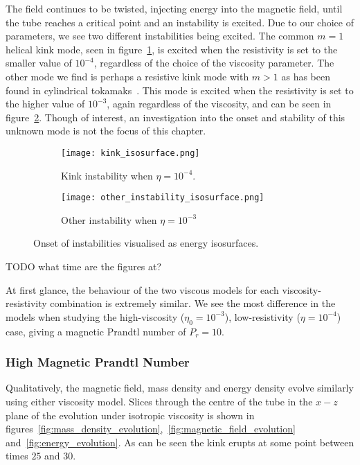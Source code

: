The field continues to be twisted, injecting energy into the magnetic field, until the tube reaches a critical point and an instability is excited. Due to our choice of parameters, we see two different instabilities being excited. The common $m=1$ helical kink mode, seen in figure~\ref{fig:kink_isosurface}, is excited when the resistivity is set to the smaller value of $10^{-4}$, regardless of the choice of the viscosity parameter. The other mode we find is perhaps a resistive kink mode with $m>1$ as has been found in cylindrical tokamaks~\cite{furthTearingModeCylindrical1973a}. This mode is excited when the resistivity is set to the higher value of $10^{-3}$, again regardless of the viscosity, and can be seen in figure~\ref{fig:other_instability_isosurface}. Though of interest, an investigation into the onset and stability of this unknown mode is not the focus of this chapter.

\begin{figure}[t]
  \centering
  \begin{subfigure}{.45\textwidth}
  \centering
  \texttt{[image: kink\_isosurface.png]}
  \caption{Kink instability when $\eta=10^{-4}$.}
  \label{fig:kink_isosurface}
  \end{subfigure}
  \begin{subfigure}{.45\textwidth}
  \centering
  \texttt{[image: other\_instability\_isosurface.png]}
  \caption{Other instability when $\eta=10^{-3}$}
  \label{fig:other_instability_isosurface}
  \end{subfigure}
  
  \caption{Onset of instabilities visualised as energy isosurfaces.}
  \label{fig:instability_isosurfaces}
\end{figure}

TODO what time are the figures at?

At first glance, the behaviour of the two viscous models for each viscosity-resistivity combination is extremely similar. We see the most difference in the models when studying the high-viscosity ($\eta_0 = 10^{-3}$), low-resistivity ($\eta = 10^{-4}$) case, giving a magnetic Prandtl number of $P_r = 10$. 

\subsubsection{High Magnetic Prandtl Number}

Qualitatively, the magnetic field, mass density and energy density evolve similarly using either viscosity model. Slices through the centre of the tube in the $x - z$ plane of the evolution under isotropic viscosity is shown in figures~\ref{fig:mass_density_evolution},~\ref{fig:magnetic_field_evolution} and~\ref{fig:energy_evolution}. As can be seen the kink erupts at some point between times $25$ and $30$.

